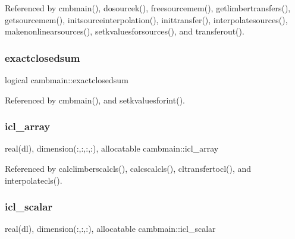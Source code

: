 Referenced by cmbmain(), dosourcek(), freesourcemem(), getlimbertransfers(), getsourcemem(), initsourceinterpolation(), inittransfer(), interpolatesources(), makenonlinearsources(), setkvaluesforsources(), and transferout().

\mbox{\label{namespacecambmain_a2ded9daf3b231818ba6168f15ce0c90f}} 
\subsubsection{\texorpdfstring{exactclosedsum}{exactclosedsum}}
{\footnotesize\ttfamily logical cambmain\+::exactclosedsum\hspace{0.3cm}{\ttfamily [private]}}



Referenced by cmbmain(), and setkvaluesforint().

\mbox{\label{namespacecambmain_a34fbba5156bf16dc5e9131c1936bf47c}} 
\subsubsection{\texorpdfstring{icl\+\_\+array}{icl\_array}}
{\footnotesize\ttfamily real(dl), dimension(\+:,\+:,\+:,\+:), allocatable cambmain\+::icl\+\_\+array\hspace{0.3cm}{\ttfamily [private]}}



Referenced by calclimberscalcls(), calcscalcls(), cltransfertocl(), and interpolatecls().

\mbox{\label{namespacecambmain_ae6d811821c995ff2a5bda416a8696ae7}} 
\subsubsection{\texorpdfstring{icl\+\_\+scalar}{icl\_scalar}}
{\footnotesize\ttfamily real(dl), dimension(\+:,\+:,\+:), allocatable cambmain\+::icl\+\_\+scalar\hspace{0.3cm}{\ttfamily [private]}}



